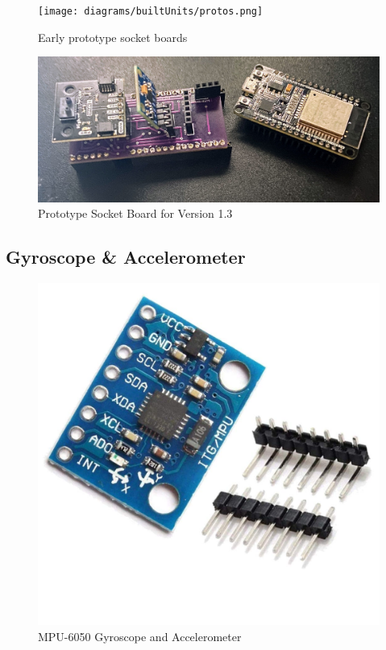 \begin{figure}
    \centering
    \texttt{[image: diagrams/builtUnits/protos.png]}
    \caption{Early prototype socket boards}
    \label{fig:protoBoard}
\end{figure}


\begin{figure}
    \centering
    \includegraphics[scale=0.15]{diagrams/builtUnits/protoBoard.JPG}
    \caption{Prototype Socket Board for Version 1.3}
    \label{fig:protoBoard2}
\end{figure}


\subsection{Gyroscope \& Accelerometer}

\begin{center}
    \begin{figure}
        \centering
        \includegraphics[scale=0.2]{diagrams/oem/6050.jpg}
        \caption{MPU-6050 Gyroscope and Accelerometer}
        \label{fig:6050}
    \end{figure}
\end{center}


